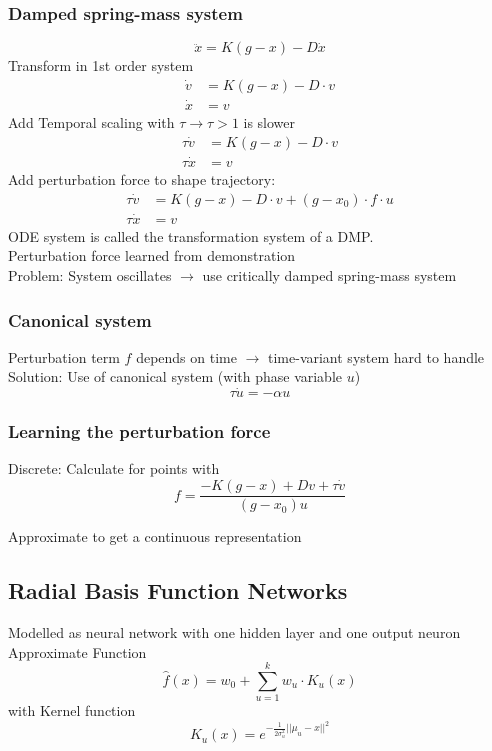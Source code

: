\subsubsection{Damped spring-mass system}%
\label{ar:ssub:damped_spring_mass_system}
\[\ddot{x} = K(g-x)-D\dot{x}\]
Transform in 1st order system
\begin{align*}
  \dot{v} &= K(g-x) - D \cdot v\\
  \dot{x} &= v
\end{align*}
Add Temporal scaling with \(\tau \rightarrow \tau > 1\) is slower
\begin{align*}
  \tau\dot{v} &= K(g-x) - D \cdot v\\
  \tau\dot{x} &= v
\end{align*}
Add perturbation force to shape trajectory:
\begin{align*}
  \tau\dot{v} &= K(g-x) - D \cdot v + (g - x_0) \cdot f \cdot u\\
  \tau\dot{x} &= v
\end{align*}
ODE system is called the transformation system of a DMP.\\
Perturbation force learned from demonstration\\

Problem: System oscillates \(\rightarrow\) use critically damped spring-mass system

\subsubsection{Canonical system}%
\label{ar:ssub:canonical_system}
Perturbation term \(f\) depends on time \(\rightarrow\) time-variant system hard to handle\\
Solution: Use of canonical system (with phase variable \(u\))
\[\tau \dot{u} = - \alpha u\]

\subsubsection{Learning the perturbation force}%
\label{ar:ssub:learning_the_perturbation_force}
Discrete: Calculate for points with \[f = \frac{-K(g-x) + Dv + \tau\dot{v}}{(g - x_0)u}\]

Approximate to get a continuous representation

\subsection{Radial Basis Function Networks}%
\label{ar:sub:radial_basis_function_networks}
Modelled as neural network with one hidden layer and one output neuron\\
Approximate Function
\[\hat{f}(x) = w_0 + \sum_{u=1}^k w_u \cdot K_u(x)\]
with Kernel function
\[K_u (x) = e^{-\frac{1}{2\sigma^2_u} || \mu_u - x||^2}\]

